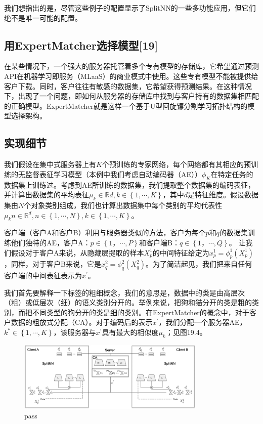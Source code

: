 我们想指出的是，尽管这些例子的配置显示了SplitNN的一些多功能应用，但它们绝不是唯一可能的配置。

\subsection{用ExpertMatcher选择模型[19]}
在某些情况下，一个强大的服务器托管着多个专有模型的存储库，它希望通过预测API在机器学习即服务（MLaaS）的商业模式中使用。这些专有模型不能被提供给客户下载。同时，客户往往有敏感的数据集，它希望获得预测结果。在这种情况下，出现了一个问题，即如何从服务器的存储库中找到与客户持有的数据集相匹配的正确模型。ExpertMatcher就是这样一个基于U型回旋镖分割学习拓扑结构的模型选择架构。

\subsection{实现细节}
我们假设在集中式服务器上有$K$个预训练的专家网络，每个网络都有其相应的预训练的无监督表征学习模型（本例中我们考虑自动编码器（AE））$\phi_{K}$在特定任务的数据集上训练过。考虑到AE所训练的数据集，我们提取整个数据集的编码表征，并计算出数据集的平均表征$\mu_{k} \in \mathbb{R}{d}, k \in \left\{ 1, \cdots, K \right\}$，其中$d$是特征维度。假设数据集由$N$个对象类别组成，我们也计算出数据集中每个类别的平均代表性$\mu_{k}{n} \in \mathbb{R}^{d}, n \in \left\{ 1, \cdots, N \right\}, k \in \left\{ 1, \cdots, K \right\}$。

客户端（客户A和客户B）利用与服务器类似的方法，客户为每个$p$和$q$的数据集训练他们独特的AE，客户A：$p \in \left\{ 1，\cdots, P \right\}$和客户端B：$q \in \left\{ 1，\cdots, Q \right\}$。 让我们假设对于客户A来说，从隐藏层提取的样本$X^1_p$的中间特征给定为$x^1_p = \phi^1_p(X^1_p)$，同样，对于客户B来说，它是$x^2_q = \phi^2_q(X^2_q)$。为了简洁起见，我们把来自任何客户端的中间表征表示为$x^{'}$。

我们首先要解释一下标签的粗细概念，我们的意思是，数据中的类是由高层次（粗）或低层次（细）的语义类别分开的。举例来说，把狗和猫分开的类是粗的类别，而把不同类型的狗分开的类是细的类别。在ExpertMatcher的概念中，对于客户数据的粗放式分配（CA）。对于编码后的表示$x^{'}$，我们分配一个服务器AE，$k^{*} \in \left\{ 1, \cdots, K \right\}$，该服务器与$x^{'}$具有最大的相似度$\mu_{k}$；见图19.4。
\begin{figure}
	\centering
	\includegraphics[width=0.8\textwidth]{chapter19/images/Fig.19.4}
	\caption{pass} \label{fig:19.4}
\end{figure}

